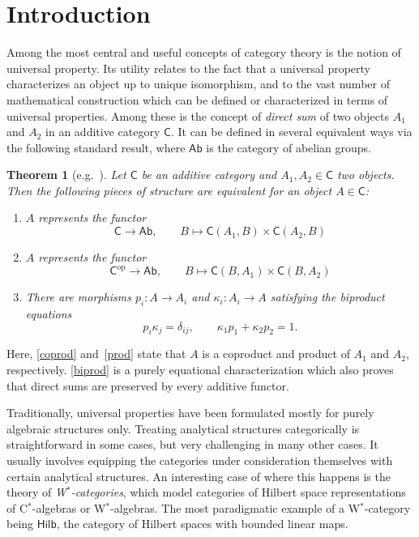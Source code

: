 \documentclass[reqno,T1,11pt]{amsproc}
\newcommand{\op}{\mathrm{op}}
\newcommand{\cat}[1]{\mathsf{#1}}		%
\newcommand{\Hilb}{\mathsf{Hilb}} 		%
\theoremstyle{plain}
\newtheorem{thm}{Theorem}[section]
\theoremstyle{remark}
\numberwithin{equation}{section}
\begin{document}
\section{Introduction}

Among the most central and useful concepts of category theory is the notion of universal property. Its utility relates to the fact that a universal property characterizes an object up to unique isomorphism, and to the vast number of mathematical construction which can be defined or characterized in terms of universal properties. Among these is the concept of \emph{direct sum} of two objects $A_1$ and $A_2$ in an additive category $\cat{C}$. It can be defined in several equivalent ways via the following standard result, where $\cat{Ab}$ is the category of abelian groups.

\begin{thm}[{e.g.~\cite[Proposition~1.2.4]{borceux}}]
\label{directsum_equiv_trad}
Let $\cat{C}$ be an additive category and $A_1,A_2\in\cat{C}$ two objects. Then the following pieces of structure are equivalent for an object $A\in\cat{C}$:
\begin{enumerate}
	\item\label{coprod} $A$ represents the functor
		\[
			\cat{C} \longrightarrow \cat{Ab}, \qquad B \longmapsto \cat{C}(A_1, B) \times \cat{C}(A_2, B)
		\]
    \item\label{prod} $A$ represents the functor
		\[
			\cat{C}^\op \longrightarrow \cat{Ab}, \qquad B \longmapsto \cat{C}(B, A_1) \times \cat{C}(B, A_2)
		\]
	\item\label{biprod} There are morphisms $p_i : A \to A_i$ and $\kappa_i : A_i \to A$ satisfying the \emph{biproduct equations}
	\[
		p_i \kappa_j = \delta_{ij}, \qquad \kappa_1 p_1 + \kappa_2 p_2 = 1.
	\]
\end{enumerate}
\end{thm}

Here, \ref{coprod} and~\ref{prod} state that $A$ is a coproduct and product of $A_1$ and $A_2$, respectively. \ref{biprod} is a purely equational characterization which also proves that direct sums are preserved by every additive functor.

Traditionally, universal properties have been formulated mostly for purely algebraic structures only. Treating analytical structures categorically is straightforward in some cases, but very challenging in many other cases. It usually involves equipping the categories under consideration themselves with certain analytical structures. An interesting case of where this happens is the theory of \emph{W$^*$-categories}, which model categories of Hilbert space representations of C$^*$-algebras or W$^*$-algebras. The most paradigmatic example of a W$^*$-category being $\Hilb$, the category of Hilbert spaces with bounded linear maps.
\end{document}
